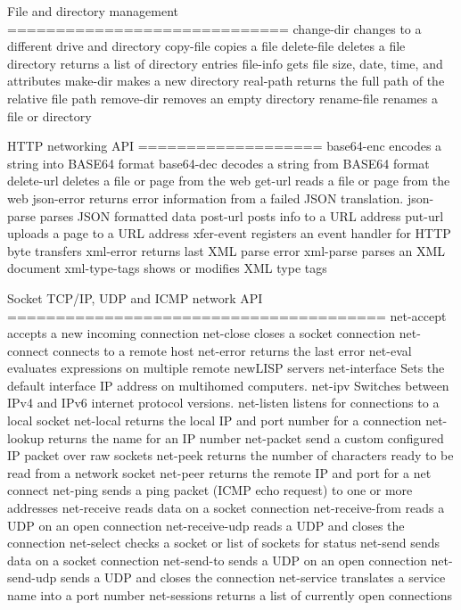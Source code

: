\documentclass[cn,11pt]{elegantbook}
\begin{document}
File and directory management
=============================
change-dir        changes to a different drive and directory
copy-file         copies a file
delete-file       deletes a file
directory         returns a list of directory entries
file-info         gets file size, date, time, and attributes
make-dir          makes a new directory
real-path         returns the full path of the relative file path
remove-dir        removes an empty directory
rename-file       renames a file or directory

HTTP networking API
===================
base64-enc        encodes a string into BASE64 format
base64-dec        decodes a string from BASE64 format
delete-url        deletes a file or page from the web
get-url           reads a file or page from the web
json-error        returns error information from a failed JSON translation.
json-parse        parses JSON formatted data
post-url          posts info to a URL address
put-url           uploads a page to a URL address
xfer-event        registers an event handler for HTTP byte transfers
xml-error         returns last XML parse error
xml-parse         parses an XML document
xml-type-tags     shows or modifies XML type tags

Socket TCP/IP, UDP and ICMP network API
=======================================
net-accept        accepts a new incoming connection
net-close         closes a socket connection
net-connect       connects to a remote host
net-error         returns the last error
net-eval          evaluates expressions on multiple remote newLISP servers
net-interface     Sets the default interface IP address on multihomed computers.
net-ipv           Switches between IPv4 and IPv6 internet protocol versions.
net-listen        listens for connections to a local socket
net-local         returns the local IP and port number for a connection
net-lookup        returns the name for an IP number
net-packet        send a custom configured IP packet over raw sockets
net-peek          returns the number of characters ready to be read from a network socket
net-peer          returns the remote IP and port for a net connect
net-ping          sends a ping packet (ICMP echo request) to one or more addresses
net-receive       reads data on a socket connection
net-receive-from  reads a UDP on an open connection
net-receive-udp   reads a UDP and closes the connection
net-select        checks a socket or list of sockets for status
net-send          sends data on a socket connection
net-send-to       sends a UDP on an open connection
net-send-udp      sends a UDP and closes the connection
net-service       translates a service name into a port number
net-sessions      returns a list of currently open connections
\end{document}
